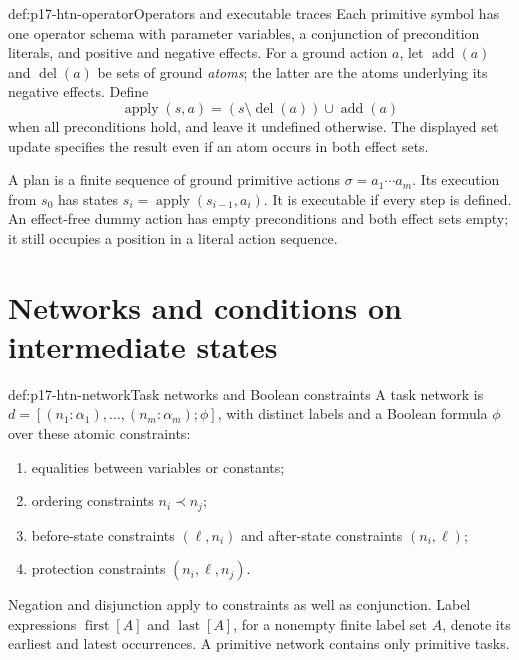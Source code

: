 \begin{hbdefinition}{def:p17-htn-operator}{Operators and executable traces}
Each primitive symbol has one operator schema with parameter variables,
a conjunction of precondition literals, and positive and negative effects.
For a ground action \(a\), let \(\operatorname{add}(a)\) and
\(\operatorname{del}(a)\) be sets of ground \emph{atoms}; the latter are the
atoms underlying its negative effects. Define
\[
 \operatorname{apply}(s,a)=
 (s\setminus\operatorname{del}(a))\cup\operatorname{add}(a)
\]
when all preconditions hold, and leave it undefined otherwise. The displayed
set update specifies the result even if an atom occurs in both effect sets.

A plan is a finite sequence of ground primitive actions
\(\sigma=a_1\cdots a_m\). Its execution from \(s_0\) has states
\(s_i=\operatorname{apply}(s_{i-1},a_i)\). It is executable if every step is
defined. An effect-free dummy action has empty preconditions and both effect
sets empty; it still occupies a position in a literal action sequence.
\end{hbdefinition}

\section{Networks and conditions on intermediate states}
\label{sec:p17-htn-networks}

\begin{hbdefinition}{def:p17-htn-network}{Task networks and Boolean constraints}
A task network is \(d=[(n_1:\alpha_1),\ldots,(n_m:\alpha_m);\phi]\), with
distinct labels and a Boolean formula \(\phi\) over these atomic constraints:
\begin{enumerate}
\item equalities between variables or constants;
\item ordering constraints \(n_i\prec n_j\);
\item before-state constraints \((\ell,n_i)\) and after-state constraints
      \((n_i,\ell)\);
\item protection constraints \((n_i,\ell,n_j)\).
\end{enumerate}
Negation and disjunction apply to constraints as well as conjunction. Label
expressions \(\operatorname{first}[A]\) and \(\operatorname{last}[A]\), for a
nonempty finite label set \(A\), denote its earliest and latest occurrences.
A primitive network contains only primitive tasks.
\end{hbdefinition}

